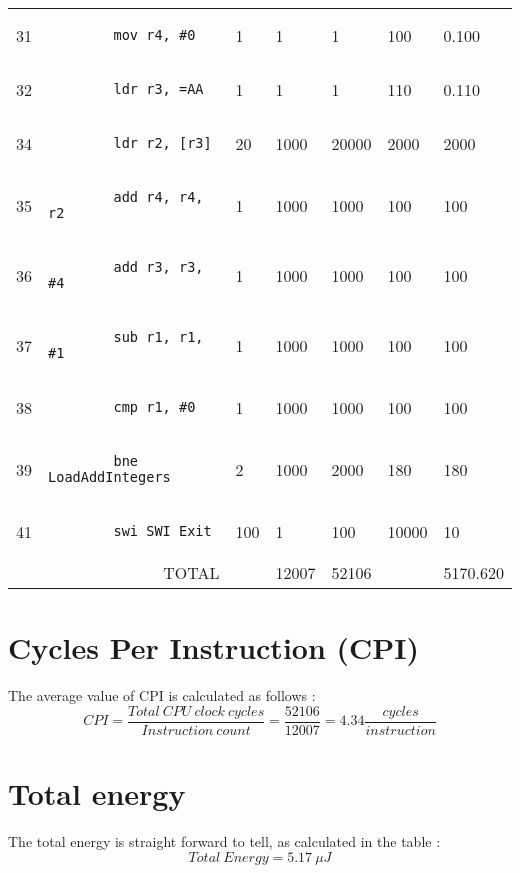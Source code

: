 \documentclass[]{article}
\begin{document}
\begin{center}
\begin{tabular}{ |p{0.6cm}|l||p{1.5cm}|p{1cm}|p{1.5cm}|p{1.25cm}|p{2cm}||  }
		31 & \begin{lstlisting}
		mov r4, #0
		\end{lstlisting}&1&1&1&100&0.100	\\
		32 & \begin{lstlisting}
		ldr r3, =AA
		\end{lstlisting}&1&1&1&110&0.110	\\
		34 & \begin{lstlisting}
		ldr r2, [r3]
		\end{lstlisting}&20&1000&20000&2000&2000 \\
		35 & \begin{lstlisting}
		add r4, r4, r2 
		\end{lstlisting}&1&1000&1000&100&100 \\
		36 & \begin{lstlisting}
		add r3, r3, #4
		\end{lstlisting}&1&1000&1000&100&100 \\
		37 & \begin{lstlisting}
		sub r1, r1, #1
		\end{lstlisting}&1&1000&1000&100&100 \\
		38 & \begin{lstlisting}
		cmp r1, #0
		\end{lstlisting}&1&1000&1000&100&100 \\
		39 & \begin{lstlisting}
		bne LoadAddIntegers
		\end{lstlisting}&2&1000&2000&180&180 \\
		41 & \begin{lstlisting}
		swi SWI_Exit
		\end{lstlisting}&100&1&100&10000&10\\
		\hline \multicolumn{2}{|r||}{TOTAL}&&12007&52106&&5170.620 \\
		\hline
	\end{tabular} 
\end{center}
\section{Cycles Per Instruction (CPI)}
\Large
The average value of CPI is calculated as follows :
\[CPI = \frac{Total\ CPU\ clock\ cycles}{Instruction\ count} = \frac{52106}{12007} = \boxed{4.34 \frac{cycles}{instruction}}\]

\section{Total energy}
\Large
The total energy is straight forward to tell, as calculated in the table : 
\[Total\ Energy = \boxed{5.17\ \mu J}\]
\end{document}
